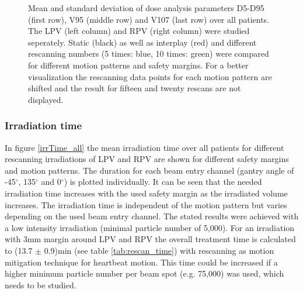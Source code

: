 \begin{figure}[H]
{ }
\caption{Mean and standard deviation of dose analysis parameters D5-D95 (first row), V95 (middle row) and V107 (last row) over all patients. 
The LPV (left column) and RPV (right column) were studied seperately. Static (black) as well as interplay (red) and different rescanning 
numbers (5 times: blue, 10 times: green) were compared for different motion patterns and safety margins. For a better visualization the 
rescanning data points for each motion pattern are shifted and the result for fifteen and twenty rescans are not displayed.}
\label{static_interplay_rescanning_ALL}
\end{figure}

\newpage


\subsubsection{Irradiation time}
In figure \ref{irrTime_all} the mean irradiation time over all patients for different rescanning irradiations of LPV and RPV are shown for 
different safety margins and motion patterns. The duration for each beam entry channel (gantry angle of -45$^{\circ}$, 135$^{\circ}$ and 0$^{\circ}$) 
is plotted individually. It can be seen that the needed irradiation time increases with the used safety margin as the irradiated volume 
increases. The irradiation time is independent of the motion pattern but varies depending on the used beam entry channel. 
The stated results were achieved with a low intensity irradiation 
(minimal particle number of 5,000). For an irradiation with 3mm margin around LPV and RPV the overall treatment time is calculated to (13.7 $\pm$ 
0.9)min (see table \ref{tab:rescan_time}) with rescanning as motion mitigation technique for heartbeat motion. This time could be increased 
if a higher minimum particle number per beam spot (e.g. 75,000) was used, which needs to be studied. 

